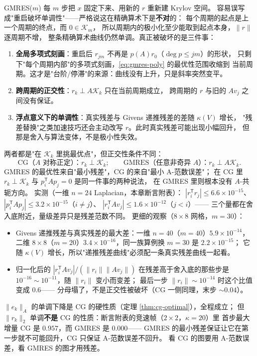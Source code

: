 \begin{remark}[重启到底破坏了什么]
\label{rem:restart}
GMRES($m$) 每 $m$ 步把 $x$ 固定下来、用新的 $r$ 重新建 Krylov 空间。
容易误写成"重启破坏单调性"——严格说这在精确算术下是\textbf{不对}的：
每个周期的起点是上一个周期的终点，而 $0\in\mathcal K_m$，
所以周期内的极小化至少能取到起点本身，$\|r\|$ 逐周期不增，
整条精确算术曲线仍然单调。真正被破坏的是三件事：
\begin{enumerate}
  \item \textbf{全局多项式刻画}：重启后 $r_{jm}$ 不再是 $p(A)r_0$（$\deg p\le jm$）的形状，
        只剩下"每个周期内部"的多项式刻画，\eqref{eq:gmres-poly} 的最优性范围收缩到
        当前周期。这才是"台阶/停滞"的来源：曲线没有上升，只是斜率突然变平。
  \item \textbf{跨周期的正交性}：$r_k\perp A\mathcal K_k$ 只在当前周期成立，
        跨周期的 $r$ 与旧的 $Av_j$ 之间没有保证。
  \item \textbf{浮点意义下的单调性}：真实残差与 Givens 递推残差的差随 $\kappa(V)$ 增长，
        "残差替换"之类加速技巧还会主动改写 $r$。此时真实残差可能出现小幅回升，
        但那是舍入与算法变体，不是极小性失效。
\end{enumerate}
\end{remark}

\begin{remark}
\label{rem:orth}
两者都是"在 $\mathcal K_k$ 里挑最优点"，但正交性条件不同：
\begin{equation}
  \text{CG（}A\text{ 对称正定）：} r_k\perp\mathcal K_k ;
  \qquad
  \text{GMRES（任意非奇异 }A\text{）：} r_k\perp A\mathcal K_k .
\end{equation}
GMRES 的最优性来自"最小残差"，CG 的来自"最小 A-范数误差"；
在 CG 里 $r_k\perp\mathcal K_k$ 与 $p_i^{\mathsf T}Ap_j=0$ 是同一件事的两种说法，
在 GMRES 里则根本没有 $A$-共轭方向。
实测（一维 $n=24$ Laplacian，本章断言附表）：
$|r_i^{\mathsf T}r_j|\le6.6\times10^{-15}$、
$|p_i^{\mathsf T}Ap_j|\le3.2\times10^{-15}$（$i\ne j$）、
$|r_i^{\mathsf T}Av_j|\le1.6\times10^{-12}$（$j<i$）——
三个量都在舍入底附近，量级差异只是残差范数不同。
更细的观察（$8\times8$ 网格，$m=30$）：
\begin{itemize}
  \item Givens 递推残差与真实残差的最大差：一维 $n=40$（$m=40$）$5.9\times10^{-14}$，
        二维 $8\times8$（$m=20$）$3.4\times10^{-16}$，同一族算例换 $m=30$ 是 $2.2\times10^{-15}$；
        它随 $\kappa(V)$ 增长，所以"递推残差曲线"必须配一条真实残差曲线一起看。
  \item 归一化后的 $|r_i^{\mathsf T}Av_j|/(\|r_i\|\|Av_j\|)$ 在残差高于舍入底的那些步是
        $10^{-16}\sim10^{-11}$，随 $\|r_i\|$ 变小而变差；
        最后一步 $\|r_i\|\sim10^{-14}$ 时这个比值变成 $0.6$——
        分母塌了，不是正交性被破坏（CG 一侧同理，末步 $\sim0.04$）。
\end{itemize}
$\|e_k\|_A$ 的单调下降是 CG 的硬性质（定理 \ref{thm:cg-optimal}），全程成立；
但 $\|r_k\|_2$ 单调\textbf{不是} CG 的性质：断言附表的竞速帧（$2\times2$，$\kappa=20$）里
首步最大增量 CG 是 $0.957$，而 GMRES 是 $0.000$——
GMRES 的最小残差保证让它在第一步就不可能回升，CG 只保证 A-范数误差不回升。
看 CG 的图要用 A-范数误差，看 GMRES 的图才用残差。
\end{remark}

